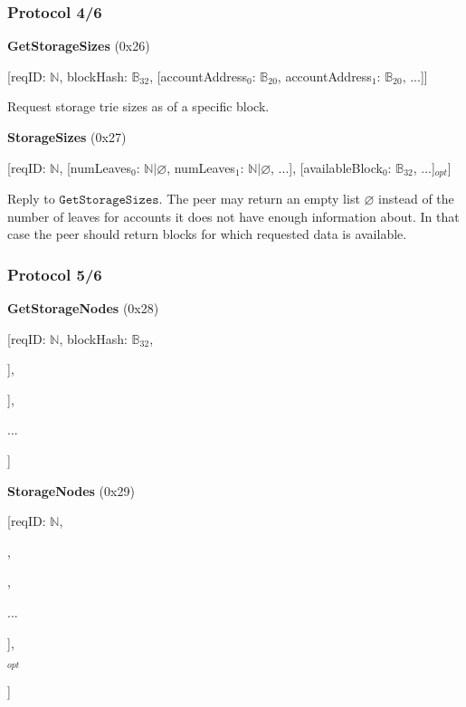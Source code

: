 \documentclass{beamer}
\begin{document}
\begin{frame}
  \frametitle{Protocol 4/6}

  \textbf{GetStorageSizes} (0x26)

  [reqID: $\mathbb{N}$, blockHash: $\mathbb{B}_{32}$,
  [accountAddress$_0$: $\mathbb{B}_{20}$, accountAddress$_1$: $\mathbb{B}_{20}$, ...]]
  \medskip
  
  Request storage trie sizes as of a specific block.

  \bigskip
  
  \textbf{StorageSizes} (0x27)
  
  [reqID: $\mathbb{N}$,
  [numLeaves$_0$: $\mathbb{N} | \varnothing$, numLeaves$_1$: $\mathbb{N} | \varnothing$, ...],
  [availableBlock$_0$: $\mathbb{B}_{32}$, ...]$_{opt}$]
  \medskip
  
  Reply to $\texttt{GetStorageSizes}$.
  The peer may return an empty list $\varnothing$ instead of the number of leaves for accounts it does not have enough information about.
  In that case the peer should return blocks for which requested data is available.  

\end{frame}

\begin{frame}
  \frametitle{Protocol 5/6}

  \textbf{GetStorageNodes} (0x28)

  [reqID: $\mathbb{N}$, blockHash: $\mathbb{B}_{32}$,
  
  \quad [accountAddress$^0$: $\mathbb{B}_{20}$, [prefix$^0_0$: $\mathbb{Y}$, prefix$^0_1$: $\mathbb{Y}$, ...]],
  
  \quad [accountAddress$^1$: $\mathbb{B}_{20}$, [prefix$^1_0$: $\mathbb{Y}$, prefix$^1_1$: $\mathbb{Y}$, ...]],
  
  \quad ...
  
  ]
  \bigskip

  \textbf{StorageNodes} (0x29)

[reqID: $\mathbb{N}$,

\quad [

\qquad [node$^0_0$: $\mathbb{B}$, node$^0_1$: $\mathbb{B}$, ...],

,

\qquad ...

\quad ],

$_{opt}$

]

\end{frame}
\end{document}
